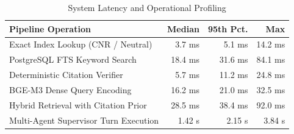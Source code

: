 \documentclass[conference]{IEEEtran}
\begin{document}
\begin{table}[t]
\caption{System Latency and Operational Profiling}
\label{tab:latency}
\centering
\footnotesize
\setlength{\tabcolsep}{5pt}
\begin{tabular}{lrrr}
\toprule
\textbf{Pipeline Operation} & \textbf{Median} & \textbf{95th Pct.} & \textbf{Max} \\
\midrule
Exact Index Lookup (CNR / Neutral) & 3.7 ms & 5.1 ms & 14.2 ms \\
PostgreSQL FTS Keyword Search & 18.4 ms & 31.6 ms & 84.1 ms \\
Deterministic Citation Verifier & 5.7 ms & 11.2 ms & 24.8 ms \\
BGE-M3 Dense Query Encoding & 16.2 ms & 21.0 ms & 32.5 ms \\
Hybrid Retrieval with Citation Prior & 28.5 ms & 38.4 ms & 92.0 ms \\
Multi-Agent Supervisor Turn Execution & 1.42 s & 2.15 s & 3.84 s \\
\bottomrule
\end{tabular}
\end{table}
\end{document}
